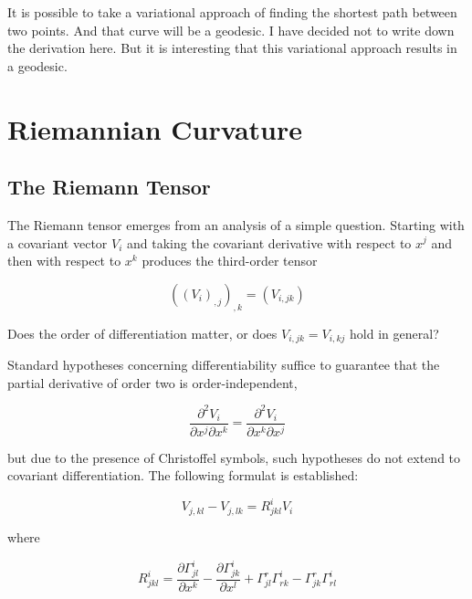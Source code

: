 \documentclass{article}
\begin{document}
It is possible to take a variational approach of finding the shortest path between two points.  And that curve will be a geodesic.  I have decided not to write down the derivation here.
But it is interesting that this variational approach results in a geodesic.





%
%
\newpage
\section{Riemannian Curvature}

\subsection{The Riemann Tensor}

The Riemann tensor emerges from an analysis of a simple question.  Starting with a covariant vector $V_i$ and taking the covariant derivative with respect to $x^j$ and then with respect
to $x^k$ produces the third-order tensor

\begin{equation*}
	((V_i)_{,j})_{,k} = (V_{i,jk})
\end{equation*}

\noindent Does the order of differentiation matter, or does $V_{i,jk} = V_{i,kj}$ hold in general?

Standard hypotheses concerning differentiability suffice to guarantee that the partial derivative of order two is order-independent,

\begin{equation*}
	\frac{ \partial^2 V_i }{ \partial x^j \partial x^k } = \frac{ \partial^2 V_i }{ \partial x^k \partial x^j }
\end{equation*}

\noindent but due to the presence of Christoffel symbols, such hypotheses do not extend to covariant differentiation.  The following formulat is established:

\begin{equation}
	V_{j,kl} - V_{j,lk} = R^i_{jkl} V_i
\end{equation}

where

\begin{equation}
	R^i_{jkl} = \frac{ \partial \Gamma^i_{jl} }{ \partial x^k } - \frac{ \partial \Gamma^i_{jk} }{ \partial x^l } + \Gamma^r_{jl} \Gamma^i_{rk} - \Gamma^r_{jk} \Gamma^i_{rl}
\end{equation}
\end{document}
